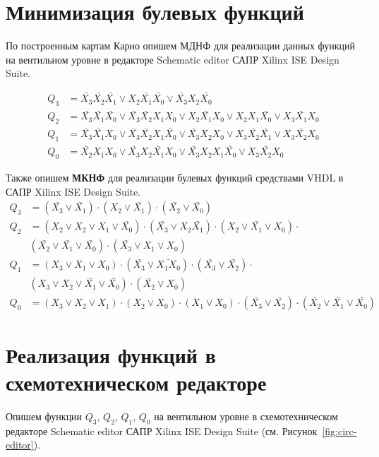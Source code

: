 \section{Минимизация булевых функций}
По построенным картам Карно опишем {МДНФ} для реализации данных функций на вентильном уровне в редакторе Schematic editor САПР Xilinx ISE Design Suite.

\begin{align}
Q_3 &= \bar{X_3}\bar{X_2}\bar{X_1} \vee  X_2 \bar{X_1}\bar{X_0}  \vee \bar{X_3} X_2\bar{X_0} \\
Q_2 &= \bar{X_3} \bar{X_1} \bar{X_0} \vee \bar{X_3} \bar{X_2} X_1 X_0 \vee X_2  \bar{X_1}  X_0 \vee X_2  X_1  \bar{X_0} \vee  X_3  \bar{X_1}  X_0 \\
Q_1 &=  \bar{X_3}\bar{X_1}X_0    \vee  \bar{X_3} \bar{X_2} X_1 \bar{X_0} \vee     \bar{X_3} X_2  X_0  \vee  X_3 \bar{X_2} \bar{X_1}   \vee  X_3 \bar{X_2} X_0 \\
Q_0 &= \bar{X_2} X_1 X_0 \vee \bar{X_3} X_2 \bar{X_1} X_0 \vee \bar{X_3} X_2 X_1 \bar{X_0} \vee X_3 \bar{X_2} X_0
\end{align}

Также опишем \textbf{МКНФ} для реализации булевых функций средствами VHDL в САПР Xilinx ISE Design Suite.
\begin{align}
Q_3 &=\left(
\bar{X_3}\vee \bar{X_1}
\right) 
\cdot 
\left(
X_2\vee \bar{X_1}
\right) 
\cdot  
\left(
\bar{X_2}\vee \bar{X_0}
\right) \\
Q_2 &= \left(
X_2 \vee X_2 \vee X_1 \vee \bar{X_0}
\right) 
\cdot 
\left( 
\bar{X_3} \vee X_2 \bar{X_1}
\right) 
\cdot 
\left(
X_2 \vee  \bar{X_1} \vee X_0
\right)
\cdot \\
& \left(
\bar{X_2}  \vee \bar{X_1} \vee \bar{X_0}
\right)
\cdot 
\left(\bar{X_3} \vee X_1 \vee X_0
\right)\\
Q_1 & = \left( X_3 \vee X_1 \vee X_0 \right) \cdot
\left( \bar{X_3} \vee \bar{X_1 X_0} \right) \cdot
\left( \bar{X_3} \vee \bar{X_2} \right) \cdot \\
& \left(X_3 \vee X_2 \vee \bar{X_1} \vee \bar{X_0}\right) \cdot
\left(\bar{X_2} \vee X_0\right)\\
Q_0 & = \left( X_3 \vee X_2 \vee X_1 \right) \cdot
\left(  X_2 \vee X_0 \right) \cdot
\left( X_1 \vee X_0  \right) \cdot
\left( \bar{X_3} \vee \bar{X_2} \right) \cdot
\left( \bar{X_2} \vee \bar{X_1} \vee \bar{X_0} \right)
\end{align}


\section{Реализация функций в схемотехническом редакторе}
Опишем функции $Q_3$,  $Q_2$, $Q_1$,  $Q_0$ на вентильном уровне в схемотехническом редакторе Schematic editor САПР Xilinx ISE Design Suite (см. Рисунок~\ref{fig:circ-editor}).

